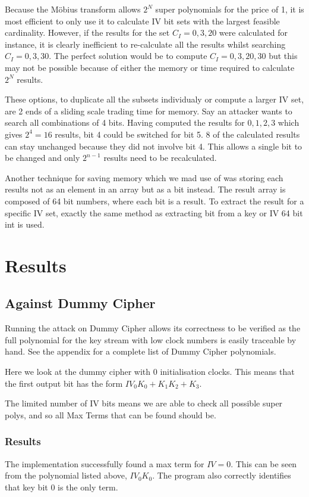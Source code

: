 \documentclass{report}
\let\Oldsection\section
\renewcommand{\section}{\FloatBarrier\Oldsection}
\let\Oldsubsection\subsection
\renewcommand{\subsection}{\FloatBarrier\Oldsubsection}
\let\Oldsubsubsection\subsubsection
\renewcommand{\subsubsection}{\FloatBarrier\Oldsubsubsection}
\begin{document}
Because the Möbius transform allows $2^N$ super polynomials for the price of 1, it is most efficient to only use it to calculate IV bit sets with the largest feasible cardinality. However, if the results for the set $C_I={0,3,20}$ were calculated for instance, it is clearly inefficient to re-calculate all the results whilst searching $C_I={0,3,30}$. The perfect solution would be to compute $C_I={0,3,20,30}$ but this may not be possible because of either the memory or time required to calculate $2^N$ results.

These options, to duplicate all the subsets individualy or compute a larger IV set, are 2 ends of a sliding scale trading time for memory. Say an attacker wants to search all combinations of 4 bits. Having computed the results for ${0,1,2,3}$ which gives $2^4=16$ results, bit 4 could be switched for bit 5. 8 of the calculated results can stay unchanged because they did not involve bit 4. This allows a single bit to be changed and only $2^{n-1}$ results need to be recalculated.

Another technique for saving memory which we mad use of was storing each results not as an element in an array but as a bit instead. The result array is composed of 64 bit numbers, where each bit is a result. To extract the result for a specific IV set, exactly the same method as extracting bit from a key or IV 64 bit int is used.

\section{Results}
\subsection{Against Dummy Cipher}
Running the attack on Dummy Cipher allows its correctness to be verified as the full polynomial for the key stream with low clock numbers is easily traceable by hand. See the appendix for a complete list of Dummy Cipher polynomials.

Here we look at the dummy cipher with 0 initialisation clocks. This means that the first output bit has the form $IV_0K_0+K_1K_2+K_3$.

The limited number of IV bits means we are able to check all possible super polys, and so all Max Terms that can be found should be.
\subsubsection{Results}
The implementation successfully found a max term for $IV={0}$. This can be seen from the polynomial listed above, $IV_0K_0$. The program also correctly identifies that key bit 0 is the only term.
\end{document}
